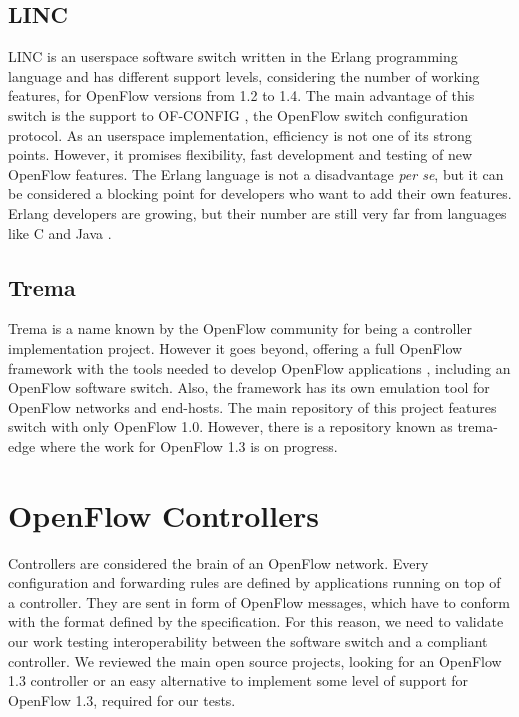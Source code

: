     \subsection{LINC}
    
    LINC \cite{linc} is an userspace software switch written in the Erlang programming language and has different support levels, considering the number of working features, for OpenFlow versions from 1.2 to 1.4. The main advantage of this switch is the support to OF-CONFIG \cite{ofconfig}, the OpenFlow switch configuration protocol. As an userspace implementation, efficiency is not one of its strong points. However, it promises flexibility, fast development and testing of new OpenFlow features. 
    The Erlang language is not a disadvantage \textit{per se}, but it can be considered a blocking point for developers who want to add their own features. Erlang developers are growing, but their number are still very far from languages like C and Java \cite{langpop}. 

    \subsection{Trema}
    
    Trema is a name known by the OpenFlow community for being a controller implementation project. However it goes beyond,  offering a full OpenFlow framework with the tools needed to develop OpenFlow applications \cite{trema}, including an OpenFlow software switch. Also, the framework has its own emulation tool for OpenFlow networks and end-hosts. The main repository of this project features switch with only OpenFlow 1.0. However, there is a repository known as trema-edge where the work for OpenFlow 1.3 is on progress.

\section{OpenFlow Controllers}

    Controllers are considered the brain of an OpenFlow network. Every configuration and forwarding rules are defined by applications running on top of a controller. They are sent in form of OpenFlow messages, which have to conform with the format defined by the specification. For this reason, we need to validate our work testing interoperability between the software switch and a compliant controller. We reviewed the main open source projects, looking for an OpenFlow 1.3 controller or an easy alternative to implement some level of support for OpenFlow 1.3, required for our tests. 

